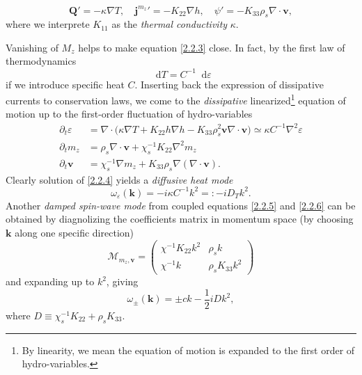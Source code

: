 \documentclass[10pt,nofootinbib,letterpaper]{revtex4}
\newcommand*\dd{\mathop{}\!\mathrm{d}}
\begin{document}
			\begin{equation}\label{2.2.3}
				\bm{Q}'=-\kappa\nabla T,\quad {\bm{j}^{m_z}}'=-K_{22}\nabla h,\quad \psi'=-K_{33}\rho_s\nabla\cdot\bm{v},
			\end{equation}
			where we interprete $K_{11}$ as the \emph{thermal conductivity} $\kappa$.\par
			Vanishing of $M_z$ helps to make equation \eqref{2.2.3} close. In fact, by the first law of thermodynamics
			\begin{equation*}
				\dd T=C^{-1}\dd\varepsilon
			\end{equation*}
			if we introduce specific heat $C$. Inserting back the expression of dissipative currents to conservation laws, we come to the \emph{dissipative} linearized\footnote{By linearity, we mean the equation of motion is expanded to the first order of hydro-variables.} equation of motion up to the first-order fluctuation of hydro-variables
			\begin{align}
				\partial_t \varepsilon&=\nabla\cdot\bigg(\kappa\nabla T+K_{22}h\nabla h-K_{33}\rho_s^2\bm{v}\nabla\cdot\bm{v}\bigg)\simeq\kappa C^{-1}\nabla^2\varepsilon\label{2.2.4}\\
				\partial_t m_z&=\rho_s\nabla\cdot\bm{v}+\chi_s^{-1}K_{22}\nabla^2m_z\label{2.2.5}\\
				\partial_t\bm{v}&=\chi_s^{-1}\nabla m_z+K_{33}\rho_s\nabla(\nabla\cdot\bm{v})\label{2.2.6}.
			\end{align}
			Clearly solution of \eqref{2.2.4} yields a \emph{diffusive heat mode}
			\begin{equation}\label{2.2.7}
				\omega_\varepsilon(\bm{k})=-i\kappa C^{-1}k^2=:-iD_Tk^2.
			\end{equation}
			Another \emph{damped spin-wave mode} from coupled equations \eqref{2.2.5} and \eqref{2.2.6} can be obtained by diagnolizing the coefficients matrix in momentum space (by choosing $\bm{k}$ along one specific direction)
			\begin{equation*}
				\mathcal{M}_{m_z,\bm{v}}=\left(\begin{array}{cc}
					\chi^{-1}K_{22}k^2 & \rho_s k \\
					\chi^{-1}k & \rho_s K_{33} k^2
				\end{array}\right)
			\end{equation*}
			and expanding up to $k^2$, giving
			\begin{equation}\label{2.2.8}
				\omega_{\pm}(\bm{k})=\pm ck-\dfrac{1}{2}iDk^2,
			\end{equation}
			where $D\equiv\chi_s^{-1}K_{22}+\rho_s K_{33}$.
	
\end{document}
